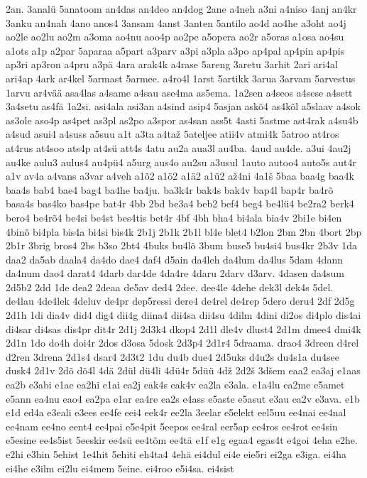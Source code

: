 {2an.
3analü
5anatoom
an4das
an4deo
an4dog
2ane
a4neh
a3ni
a4niso
4anj
an4kr
3anku
an4nah
4ano
anos4
3ansam
4anst
3anten
5antilo
ao4d
ao4he
a3oht
ao4j
ao2le
ao2lu
ao2m
a3oma
ao4nu
aoo4p
ao2pe
a5opera
ao2r
a5oras
a1osa
ao4su
a1ots
a1p
a2par
5aparaa
a5part
a3parv
a3pi
a3pla
a3po
ap4pal
ap4pin
ap4pis
ap3ri
ap3ron
a4pru
a3pä
4ara
arak4k
a4rase
5areng
3aretu
3arhit
2ari
ari4al
ari4ap
4ark
ar4kel
5armast
5armee.
a4ro4l
1arst
5artikk
3arua
3arvam
5arvestus
1arvu
ar4vää
asa4las
a4same
a4sau
ase4ma
as5ema.
1a2sen
a4seos
a4sese
a4sett
3a4setu
as4fä
1a2si.
asi4ala
asi3an
a4sind
asip4
5asjan
askõ4
as4kõl
a5slaav
a4sok
as3ole
aso4p
as4pet
as3pl
as2po
a3spor
as4san
ass5t
4asti
5astme
ast4rak
a4su4b
a4sud
asui4
a4suss
a5suu
a1t
a3ta
a4taž
5ateljee
atii4v
atmi4k
5atroo
at4ros
at4rus
at4soo
ats4p
at4sü
att4s
4atu
au2a
aua3l
au4ba.
4aud
au4de.
a3ui
4au2j
au4ke
aulu3
aulus4
au4pü4
a5urg
aus4o
au2su
a3usul
1auto
autoo4
auto5s
aut4r
a1v
av4a
a4vans
a3var
a4veh
a1õ2
a1ö2
a1ä2
a1ü2
až4ni
4a1š
5baa
baa4g
baa4k
baa4s
bab4
bae4
bag4
ba4he
ba4ju.
ba3k4r
bak4s
bak4v
bap4l
bap4r
ba4rõ
basa4s
bas4ko
bas4pe
bat4r
4bb
2bd
be3a4
beb2
bef4
beg4
be4lü4
be2ra2
berk4
bero4
be4rõ4
be4si
be4st
bes4tis
bet4r
4bf
4bh
bha4
bi4ala
bia4v
2bi1e
bi4en
4binõ
bi4pla
bis4a
bi4si
bis4k
2b1j
2b1k
2b1l
bl4e
blet4
b2lon
2bm
2bn
4bort
2bp
2b1r
3brig
bros4
2bs
b3so
2bt4
4buks
bu4lõ
3bum
buse5
bu4si4
bus4kr
2b3v
1da
daa2
da5ab
daala4
da4do
dae4
daf4
d5ain
da4leh
da4lum
da4lus
5dam
4dann
da4num
dao4
darat4
4darb
dar4de
4da4re
4daru
2darv
d3arv.
4dasen
da4sum
2d5b2
2dd
1de
dea2
2deaa
de5av
ded4
2dee.
dee4le
4dehe
dek3l
dek4s
5del.
de4lau
4de4lek
4deluv
de4pr
dep5ressi
dere4
de4rel
de4rep
5dero
deru4
2df
2d5g
2d1h
1di
dia4v
did4
dig4
dii4g
diina4
dii4sa
dii4su
4dilm
4dini
di2os
di4plo
dis4ai
di4sar
di4sas
dis4pr
dit4r
2d1j
2d3k4
dkop4
2d1l
dle4v
dlust4
2d1m
dmee4
dmi4k
2d1n
1do
do4h
doi4r
2dos
d3osa
5dosk
2d3p4
2d1r4
5draama.
drao4
3dreen
d4rel
d2ren
3drena
2d1s4
dsar4
2d3t2
1du
du4b
due4
2d5uks
d4u2s
du4s1a
du4see
dusk4
2d1v
2dõ
dõ4l
4dä
2dül
dü4li
4dü4r
5düü
4dž
2d2š
3dšem
eaa2
ea3aj
e1aas
ea2b
e3abi
e1ae
ea2hi
e1ai
ea2j
eak4s
eak4v
ea2la
e3ala.
e1a4lu
ea2me
e5amet
e5ann
ea4nu
eao4
ea2pa
e1ar
ea4re
ea2s
e4ass
e5aste
e5asut
e3au
ea2v
e3ava.
e1b
e1d
ed4a
e3eali
e3ees
ee4fe
eei4
eek4r
ee2la
3eelar
e5elekt
eel5uu
ee4nai
ee4nal
ee4nam
ee4no
eent4
ee4pai
e5e4pit
5eepos
ee4ral
eer5ap
ee4ros
ee4rot
ee4sin
e5esine
ee4s5ist
5eeskir
ee4sü
ee4tõm
ee4tä
e1f
e1g
egaa4
egas4t
e4goi
4eha
e2he.
e2hi
e3hin
5ehist
1e4hit
5ehiti
eh4ta4
4ehä
ei4dul
ei4e
eie5ri
ei2ga
e3iga.
ei4ha
ei4he
e3ilm
ei2lu
ei4mem
5eine.
ei4roo
e5i4sa.
ei4sist
}
